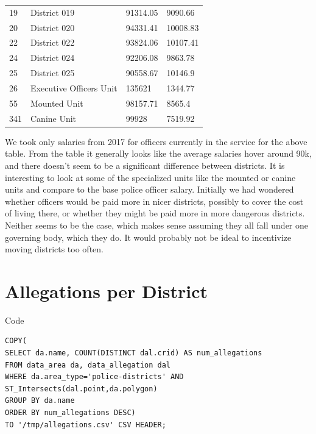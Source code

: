 \documentclass{article}
\begin{document}
\begin{table}[h]
\begin{tabular}{|l|l|l|l|}
19         & District 019                                          & 91314.05        & 9090.66     \\
20         & District 020                                          & 94331.41        & 10008.83    \\
22         & District 022                                          & 93824.06        & 10107.41    \\
24         & District 024                                          & 92206.08        & 9863.78     \\
25         & District 025                                          & 90558.67        & 10146.9     \\
26         & Executive Officers Unit                               & 135621          & 1344.77     \\
55         & Mounted Unit                                          & 98157.71        & 8565.4      \\
341        & Canine Unit                                           & 99928           & 7519.92        
\\
\hline
\end{tabular}
\end{table}

We took only salaries from 2017 for officers currently in the service for the above table. From the table it generally looks like the average salaries hover around 90k, and there doesn't seem to be a significant difference between districts. It is interesting to look at some of the specialized units like the mounted or canine units and compare to the base police officer salary. Initially we had wondered whether officers would be paid more in nicer districts, possibly to cover the cost of living there, or whether they might be paid more in more dangerous districts. Neither seems to be the case, which makes sense assuming they all fall under one governing body, which they do. It would probably not be ideal to incentivize moving districts too often.


\FloatBarrier
\section{Allegations per District}

\begin{center}
Code
\end{center}
\begin{lstlisting}[frame=single]
COPY(
SELECT da.name, COUNT(DISTINCT dal.crid) AS num_allegations
FROM data_area da, data_allegation dal
WHERE da.area_type='police-districts' AND ST_Intersects(dal.point,da.polygon)
GROUP BY da.name
ORDER BY num_allegations DESC)
TO '/tmp/allegations.csv' CSV HEADER;
\end{lstlisting}
\end{document}
